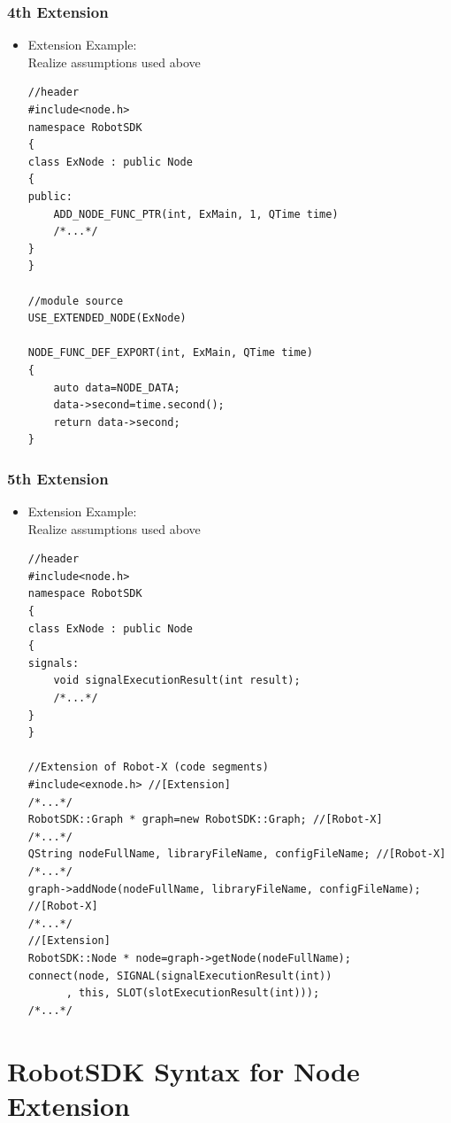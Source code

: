 \documentclass[a4paper,10pt]{book}
\begin{document}
\subsubsection{4th Extension}

\begin{mdframed}
\begin{itemize}
 \item Extension Example: \\ Realize assumptions used above
\begin{verbatim}
//header
#include<node.h>
namespace RobotSDK
{
class ExNode : public Node
{
public:
    ADD_NODE_FUNC_PTR(int, ExMain, 1, QTime time)
    /*...*/
}
}

//module source
USE_EXTENDED_NODE(ExNode)

NODE_FUNC_DEF_EXPORT(int, ExMain, QTime time)
{
    auto data=NODE_DATA;
    data->second=time.second();
    return data->second;
}
\end{verbatim}
\end{itemize}
\end{mdframed}

\subsubsection{5th Extension}

\begin{mdframed}
\begin{itemize}
 \item Extension Example: \\ Realize assumptions used above
\begin{verbatim}
//header
#include<node.h>
namespace RobotSDK
{
class ExNode : public Node
{
signals:
    void signalExecutionResult(int result);
    /*...*/
}
}

//Extension of Robot-X (code segments)
#include<exnode.h> //[Extension]
/*...*/
RobotSDK::Graph * graph=new RobotSDK::Graph; //[Robot-X]
/*...*/
QString nodeFullName, libraryFileName, configFileName; //[Robot-X]
/*...*/
graph->addNode(nodeFullName, libraryFileName, configFileName); //[Robot-X]
/*...*/
//[Extension]
RobotSDK::Node * node=graph->getNode(nodeFullName);
connect(node, SIGNAL(signalExecutionResult(int))
      , this, SLOT(slotExecutionResult(int)));
/*...*/
\end{verbatim}
\end{itemize}
\end{mdframed}

\section{RobotSDK Syntax for Node Extension}
\end{document}
